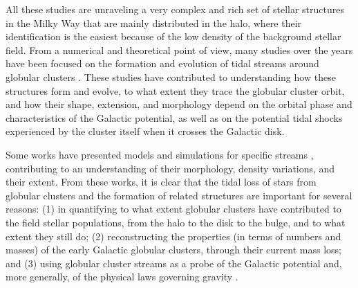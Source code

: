 All these studies are unraveling  a very complex and rich set of stellar structures in the Milky Way that are mainly distributed in the halo, where their identification is the easiest because of the low density of the background stellar field. 
From a numerical and theoretical point of view, many studies over the years have been focused on the formation and evolution of tidal streams around globular clusters \citep{1975AJ.....80..290K, 1992ApJ...386..506O, 1992ApJ...386..519O, 1998ASPC..136...45G, combes99, 2002MNRAS.332..915I, 2002ApJ...570..656J, 2002JKAS...35...75Y, capuzzo05, 2005CeMDA..91...59D, 2007ApJ...659.1212M, 2008ApJ...681...40S, 2010MNRAS.401..105K, 2010MNRAS.406.2732L, 2012MNRAS.420.2700K, 2012A&A...546L...7M, 2013MNRAS.433.1813S,  2014ApJ...795...95B, 2016MNRAS.463L..17A, 2016MNRAS.463..102E, 2016MNRAS.457.3817S, 2017NatAs...1..633P, carlberg18,  2018A&A...609A..44T, carlberg20, 2022A&A...667A.112V}. These studies have contributed to understanding how these structures form and evolve, to what extent they trace the globular cluster orbit, and how their shape, extension, and morphology depend on the orbital phase and characteristics of the Galactic potential, as well as  on the potential tidal shocks experienced by the cluster itself when it crosses the Galactic disk.


Some works have presented models and simulations for specific streams \citep{2004AJ....127.2753D, 2012A&A...546L...7M, 2019MNRAS.484.2009B, 2019ApJ...880...38B, 2021JCAP...10..043B, 2021DDA....5240106B}, contributing to an understanding of their morphology, density variations, and their extent. From these works, it is clear that the tidal loss of stars from globular clusters and the formation of related structures are important for several reasons: (1) in quantifying to what extent globular clusters have contributed to the field stellar populations, from the halo to the disk to the bulge, and to what extent they still do; (2) reconstructing the properties (in terms of numbers and masses) of the early Galactic globular clusters, through their current mass loss; and (3) using globular cluster streams as a probe of the Galactic potential and, more generally, of the physical laws governing gravity \citep[see, e.g., ][]{2018A&A...609A..44T, bianchini19, 2020PhRvD.102h4066N, 2021JCAP...10..043B}.

